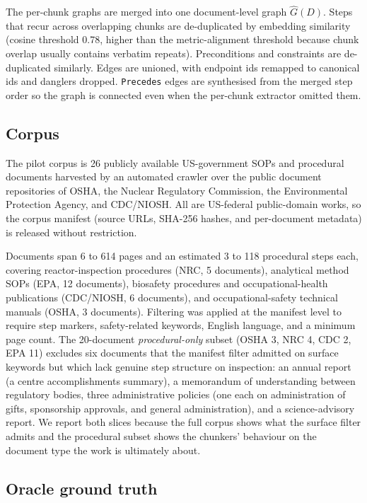 \documentclass[fleqn,10pt]{wlscirep}
\begin{document}
The per-chunk graphs are merged into one document-level graph
$\hat{G}(D)$. Steps that recur across overlapping chunks are
de-duplicated by embedding similarity (cosine threshold 0.78, higher
than the metric-alignment threshold because chunk overlap usually
contains verbatim repeats). Preconditions and constraints are
de-duplicated similarly. Edges are unioned, with endpoint ids remapped
to canonical ids and danglers dropped. \texttt{Precedes} edges are
synthesised from the merged step order so the graph is connected even
when the per-chunk extractor omitted them.

\subsection*{Corpus}

The pilot corpus is 26 publicly available US-government SOPs and
procedural documents harvested by an automated crawler over the public
document repositories of OSHA, the Nuclear Regulatory Commission, the
Environmental Protection Agency, and CDC/NIOSH. All are US-federal
public-domain works, so the corpus manifest (source URLs, SHA-256
hashes, and per-document metadata) is released without restriction.

Documents span 6 to 614 pages and an estimated 3 to 118 procedural
steps each, covering reactor-inspection procedures (NRC, 5 documents),
analytical method SOPs (EPA, 12 documents), biosafety procedures and
occupational-health publications (CDC/NIOSH, 6 documents), and
occupational-safety technical manuals (OSHA, 3 documents). Filtering
was applied at the manifest level to require step markers,
safety-related keywords, English language, and a minimum page count.
The 20-document \emph{procedural-only} subset (OSHA 3, NRC 4, CDC 2,
EPA 11) excludes six documents that the manifest filter admitted on
surface keywords but which lack genuine step structure on inspection:
an annual report (a centre accomplishments summary), a memorandum of
understanding between regulatory bodies, three administrative policies
(one each on administration of gifts, sponsorship approvals, and
general administration), and a science-advisory report. We report both slices because the full
corpus shows what the surface filter admits and the procedural subset
shows the chunkers' behaviour on the document type the work is
ultimately about.

\subsection*{Oracle ground truth}
\end{document}
